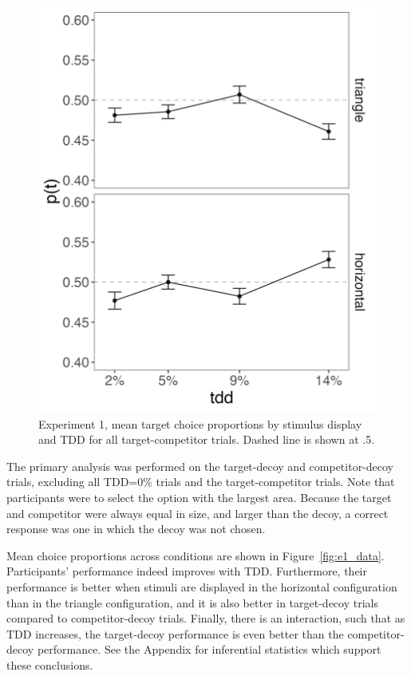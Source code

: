 \begin{figure}
   \includegraphics[width=\textwidth]{figures/2afc_tc_choices.jpeg}
   \caption{Experiment 1, mean target choice proportions by stimulus display and TDD for all target-competitor trials. Dashed line is shown at .5.}
   \label{fig:e1_tc}
\end{figure}

The primary analysis was performed on the target-decoy and competitor-decoy trials, excluding all TDD=$0\%$ trials and the target-competitor trials. Note that participants were to select the option with the largest area. Because the target and competitor were always equal in size, and larger than the decoy, a correct response was one in which the decoy was not chosen. 

Mean choice proportions across conditions are shown in Figure~\ref{fig:e1_data}. Participants' performance indeed improves with TDD. Furthermore, their performance is better when stimuli are displayed in the horizontal configuration than in the triangle configuration, and it is also better in target-decoy trials compared to competitor-decoy trials. Finally, there is an interaction, such that as TDD increases, the target-decoy performance is even better than the competitor-decoy performance. See the Appendix for inferential statistics which support these conclusions.

